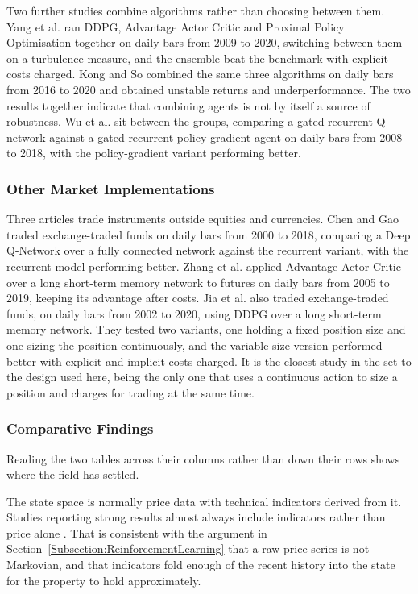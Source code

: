 Two further studies combine algorithms rather than choosing between them. Yang et al. \cite{yang_deep_2020} ran DDPG, Advantage Actor Critic and Proximal Policy Optimisation together on daily bars from 2009 to 2020, switching between them on a turbulence measure, and the ensemble beat the benchmark with explicit costs charged. Kong and So \cite{kong_empirical_2023} combined the same three algorithms on daily bars from 2016 to 2020 and obtained unstable returns and underperformance. The two results together indicate that combining agents is not by itself a source of robustness. Wu et al. \cite{wu_adaptive_2020} sit between the groups, comparing a gated recurrent Q-network against a gated recurrent policy-gradient agent on daily bars from 2008 to 2018, with the policy-gradient variant performing better.

\subsubsection{Other Market Implementations}

Three articles trade instruments outside equities and currencies. Chen and Gao \cite{chen_application_2019} traded exchange-traded funds on daily bars from 2000 to 2018, comparing a Deep Q-Network over a fully connected network against the recurrent variant, with the recurrent model performing better. Zhang et al. \cite{zhang_deep_2020} applied Advantage Actor Critic over a long short-term memory network to futures on daily bars from 2005 to 2019, keeping its advantage after costs. Jia et al. \cite{jia_lstm-ddpg_2021} also traded exchange-traded funds, on daily bars from 2002 to 2020, using DDPG over a long short-term memory network. They tested two variants, one holding a fixed position size and one sizing the position continuously, and the variable-size version performed better with explicit and implicit costs charged. It is the closest study in the set to the design used here, being the only one that uses a continuous action to size a position and charges for trading at the same time.

\subsubsection{Comparative Findings}

Reading the two tables across their columns rather than down their rows shows where the field has settled.

The state space is normally price data with technical indicators derived from it. Studies reporting strong results almost always include indicators rather than price alone \cite{carapuco_reinforcement_2018, huang_financial_2018, yang_deep_2020}. That is consistent with the argument in Section~\ref{Subsection:ReinforcementLearning} that a raw price series is not Markovian, and that indicators fold enough of the recent history into the state for the property to hold approximately.

